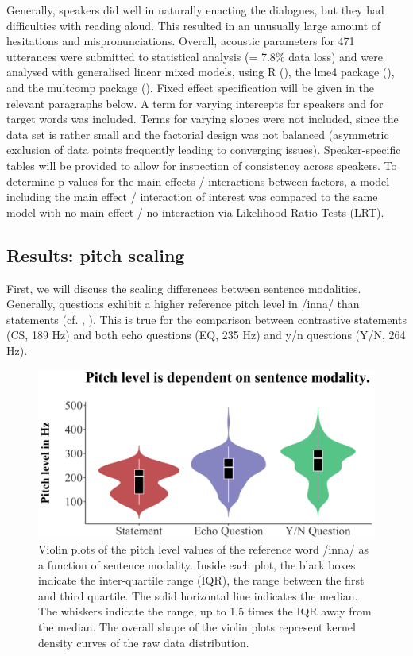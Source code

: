 Generally, speakers did well in naturally enacting the dialogues, but they had difficulties with reading aloud. This resulted in an unusually large amount of hesitations and mispronunciations. Overall, acoustic parameters for 471 utterances were submitted to statistical analysis (= 7.8\% data loss) and were analysed with generalised linear mixed models, using R (\citealt{R}), the lme4 package (\citealt{Bates.etal2014}), and the multcomp package (\citealt{Hothorn.etal2008}). Fixed effect specification will be given in the relevant paragraphs below. A term for varying intercepts for speakers and for target words was included. Terms for varying slopes were not included, since the data set is rather small and the factorial design was not balanced (asymmetric exclusion of data points frequently leading to converging issues). Speaker-specific tables will be provided to allow for inspection of consistency across speakers. To determine p-values for the main effects / interactions between factors, a model including the main effect / interaction of interest was compared to the same model with no main effect / no interaction via Likelihood Ratio Tests (LRT). 

\subsection{Results: pitch scaling}
First, we will discuss the scaling differences between sentence modalities. Generally, questions exhibit a higher reference pitch level in /inna/ than statements (cf. , ). This is true for the comparison between contrastive statements (CS, 189 Hz) and both echo questions (EQ, 235 Hz) and y/n questions (Y/N, 264 Hz).

  \begin{figure}
  \centering 
   \includegraphics[width=1\textwidth]{figures/Figure_5_5.png}
  \caption{Violin plots of the pitch level values of the reference word /inna/ as a function of sentence modality. Inside each plot, the black boxes indicate the inter-quartile range (IQR), the range between the first and third quartile. The solid horizontal line indicates the median. The whiskers indicate the range, up to 1.5 times the IQR away from the median. The overall shape of the violin plots represent kernel density curves of the raw data distribution.}
   \label{fig:5.5}
   \end{figure}

